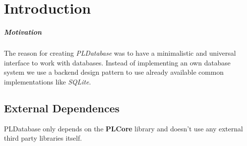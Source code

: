 \chapter{Introduction}


\paragraph{Motivation}
The reason for creating \emph{PLDatabase} was to have a minimalistic and universal interface to work with databases. Instead of implementing an own database system we use a backend design pattern to use already available common implementations like \emph{SQLite}.


\section{External Dependences}
PLDatabase only depends on the \textbf{PLCore} library and doesn't use any external third party libraries itself.
